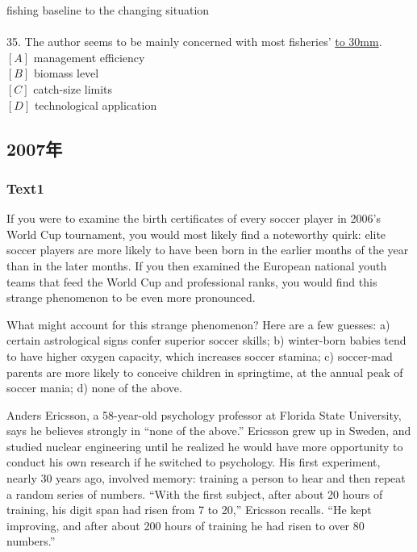 \documentclass[a4paper]{article}
\begin{document}
fishing baseline to the changing situation\\\\35.	The author seems to be mainly concerned with most fisheries’ \underline{\hbox to 30mm{}}.\\$[A]$ management efficiency\\$[B]$ biomass level\\$[C]$ catch-size limits\\$[D]$ technological application\\\subsection{2007年}
\subsubsection{Text1}

\par
If you were to examine the birth certificates of every soccer player in 2006’s World Cup tournament, you would most likely find a noteworthy quirk: elite soccer players are more likely to have been born in the earlier months of the year than in the later months. If you then examined the European national youth teams that feed the World Cup and professional ranks, you would find this strange phenomenon to be even more pronounced.

\par
What might account for this strange phenomenon? Here are a few guesses: a) certain astrological signs confer superior soccer skills; b) winter-born babies tend to have higher oxygen capacity, which increases soccer stamina; c) soccer-mad parents are more likely to conceive children in springtime, at the annual peak of soccer mania; d) none of the above.

\par
Anders Ericsson, a 58-year-old psychology professor at Florida State University, says he believes strongly in “none of the above.” Ericsson grew up in Sweden, and studied nuclear engineering until he realized he would have more opportunity to conduct his own research if he switched to psychology. His first experiment, nearly 30 years ago, involved memory: training a person to hear and then repeat a random series of numbers. “With the first subject, after about 20 hours of training, his digit span had risen from 7 to 20,” Ericsson recalls. “He kept improving, and after about 200 hours of training he had risen to over 80 numbers.”
\end{document}
